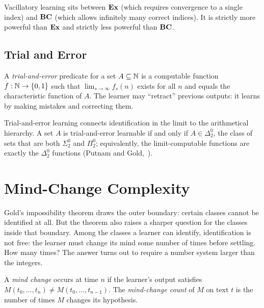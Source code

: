 Vacillatory learning sits between $\mathbf{Ex}$ (which requires convergence to a single index) and $\mathbf{BC}$ (which allows infinitely many correct indices). It is strictly more powerful than $\mathbf{Ex}$ and strictly less powerful than $\mathbf{BC}$.

\subsection{Trial and Error}
\label{sec:trial-error}

\begin{defn}
\label{def:trial-error}
A \emph{trial-and-error} predicate for a set $A \subseteq \mathbb{N}$ is a computable function $f : \mathbb{N} \to \{0, 1\}$ such that $\lim_{s \to \infty} f_s(n)$ exists for all $n$ and equals the characteristic function of $A$. The learner may ``retract'' previous outputs: it learns by making mistakes and correcting them.
\end{defn}

Trial-and-error learning connects identification in the limit to the arithmetical hierarchy. A set $A$ is trial-and-error learnable if and only if $A \in \Delta^0_2$, the class of sets that are both $\Sigma^0_2$ and $\Pi^0_2$; equivalently, the limit-computable functions are exactly the $\Delta^0_2$ functions (Putnam and Gold,~\cite{Gold1965}).


\section{Mind-Change Complexity}
\label{sec:mind-change}

Gold's impossibility theorem draws the outer boundary: certain classes cannot be identified at all. But the theorem also raises a sharper question for the classes inside that boundary. Among the classes a learner can identify, identification is not free: the learner must change its mind some number of times before settling. How many times? The answer turns out to require a number system larger than the integers.

\begin{defn}
\label{def:mind-change}
A \emph{mind change} occurs at time $n$ if the learner's output satisfies $M(t_0, \ldots, t_n) \neq M(t_0, \ldots, t_{n-1})$. The \emph{mind-change count} of $M$ on text $t$ is the number of times $M$ changes its hypothesis.
\end{defn}

